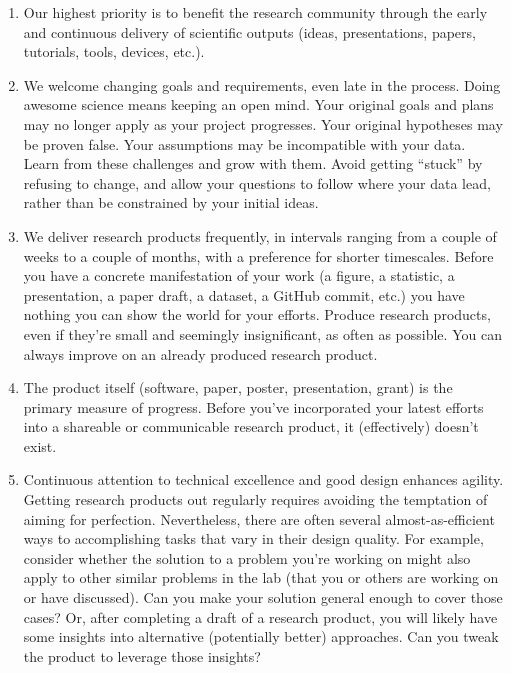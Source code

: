 \documentclass{tufte-book} %
\begin{document}
\begin{enumerate}
\item Our highest priority is to benefit the research community
  through the early and continuous delivery of scientific outputs
  (ideas, presentations, papers, tutorials, tools, devices, etc.).

\item We welcome changing goals and requirements, even late in the process.  Doing
  awesome science means keeping an open mind.  Your original goals and
  plans may no longer apply as your project progresses.  Your original
  hypotheses may be proven false.  Your assumptions may be
  incompatible with your data.  Learn from these challenges and grow
  with them.  Avoid getting ``stuck'' by refusing to change, and allow your questions to follow where your data lead, rather than be constrained by your initial ideas.

\item We deliver research products frequently, in intervals ranging from a couple of weeks to
  a couple of months, with a preference for shorter timescales.
  Before you have a concrete manifestation of your work (a figure, a
  statistic, a presentation, a paper draft, a dataset, a GitHub
  commit, etc.) you have nothing you can show the world for your
  efforts.  Produce research products, even if they're small and
  seemingly insignificant, as often as possible.  You can always
  improve on an already produced research product.

  \item The product itself (software, paper, poster,
  presentation, grant) is the primary measure of progress.  Before you've
  incorporated your latest efforts into a shareable or communicable
  research product, it (effectively) doesn't exist.

  \item Continuous attention to technical excellence and good design
  enhances agility.  Getting research products out regularly requires
  avoiding the temptation of aiming for perfection.  Nevertheless,
  there are often several almost-as-efficient ways to accomplishing
  tasks that vary in their design quality.  For example, consider
  whether the solution to a problem you're working on might also apply
  to other similar problems in the lab (that you or others are working
  on or have discussed).  Can you make your solution general enough to
  cover those cases?  Or, after completing a draft of a research
  product, you will likely have some insights into alternative
  (potentially better) approaches.  Can you tweak the product to
  leverage those insights?


\end{enumerate}
\end{document}
